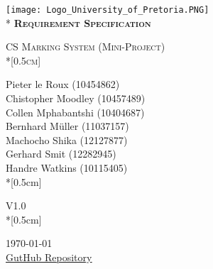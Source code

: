 \documentclass[12pt, a4paper]{scrartcl}
\begin{document}
         
	\begin{titlepage}
		\begin{center}
		\texttt{[image: Logo\_University\_of\_Pretoria.PNG]}\\*
		\vspace{3.0cm}
		\textsc{\LARGE \bf{Requirement Specification}}

		\textsc{\Large CS Marking System (Mini-Project)\\*[0.5cm]}

			Pieter le Roux (10454862)\\
			Chistopher Moodley (10457489)\\
			Collen Mphabantshi (10404687)\\
			Bernhard M\"uller (11037157)\\
			Machocho Shika (12127877)\\
			Gerhard Smit (12282945)\\
			Handre Watkins (10115405)\\*[0.5cm]

			V1.0\\*[0.5cm]

			{\large \today} \\

			\vspace{0.5cm}
			\href{https://github.com/HandreWatkins/Phase1-COS/}{\underline {GutHub Repository}}

		\end{center}
	\end{titlepage}


		\thispagestyle{empty}
\end{document}
